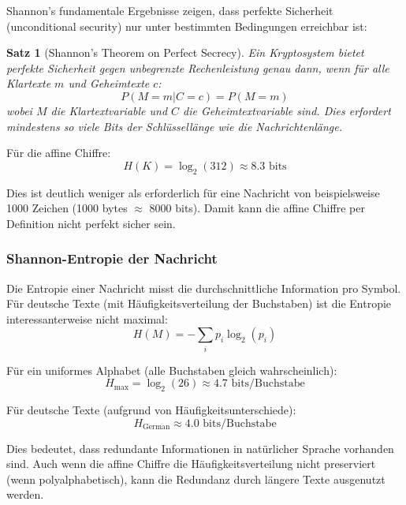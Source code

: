 ﻿\documentclass[12pt,a4paper]{article}
\newtheorem{theorem}{Satz}
\begin{document}
	Shannon's fundamentale Ergebnisse zeigen, dass perfekte Sicherheit (unconditional security) nur unter bestimmten Bedingungen erreichbar ist:
	
	\begin{theorem}[Shannon's Theorem on Perfect Secrecy]
		Ein Kryptosystem bietet perfekte Sicherheit gegen unbegrenzte Rechenleistung genau dann, wenn für alle Klartexte $m$ und Geheimtexte $c$:
		\begin{equation}
			P(M = m | C = c) = P(M = m)
		\end{equation}
		wobei $M$ die Klartextvariable und $C$ die Geheimtextvariable sind. Dies erfordert mindestens so viele Bits der Schlüssellänge wie die Nachrichtenlänge.
	\end{theorem}
	
	Für die affine Chiffre:
	\begin{equation}
		H(K) = \log_2(312) \approx 8.3 \text{ bits}
	\end{equation}
	
	Dies ist deutlich weniger als erforderlich für eine Nachricht von beispielsweise 1000 Zeichen (1000 bytes $\approx$ 8000 bits). Damit kann die affine Chiffre per Definition nicht perfekt sicher sein.
	
	\subsubsection{Shannon-Entropie der Nachricht}
	
	Die Entropie einer Nachricht misst die durchschnittliche Information pro Symbol. Für deutsche Texte (mit Häufigkeitsverteilung der Buchstaben) ist die Entropie interessanterweise nicht maximal:
	\begin{equation}
		H(M) = -\sum_{i} p_i \log_2(p_i)
	\end{equation}
	
	Für ein uniformes Alphabet (alle Buchstaben gleich wahrscheinlich):
	\begin{equation}
		H_{\max} = \log_2(26) \approx 4.7 \text{ bits/Buchstabe}
	\end{equation}
	
	Für deutsche Texte (aufgrund von Häufigkeitsunterschiede):
	\begin{equation}
		H_{\text{German}} \approx 4.0 \text{ bits/Buchstabe}
	\end{equation}
	
	Dies bedeutet, dass redundante Informationen in natürlicher Sprache vorhanden sind. Auch wenn die affine Chiffre die Häufigkeitsverteilung nicht preserviert (wenn polyalphabetisch), kann die Redundanz durch längere Texte ausgenutzt werden.
	
\end{document}
